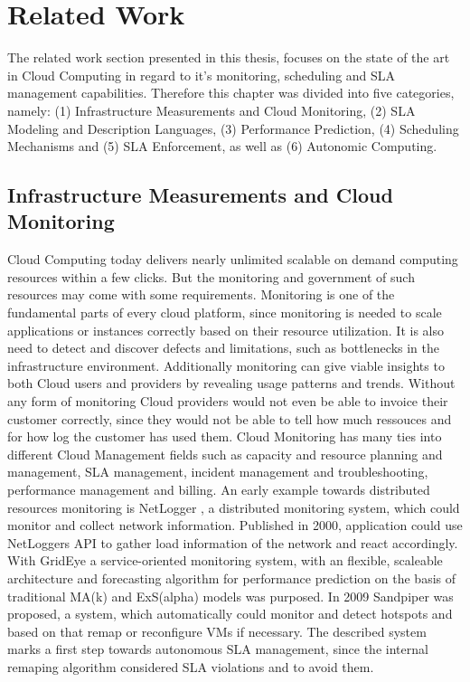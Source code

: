 
\chapter{Related Work} %
\label{Related Work} %
The related work section presented in this thesis, focuses on the state of the art in Cloud Computing in regard to it's monitoring, scheduling and SLA management capabilities. Therefore this chapter was divided into five categories, namely: (1) Infrastructure Measurements and Cloud Monitoring, (2) SLA Modeling and Description Languages, (3) Performance Prediction, (4) Scheduling Mechanisms and (5) SLA Enforcement, as well as (6) Autonomic Computing.

\section{Infrastructure Measurements and Cloud Monitoring}
Cloud Computing today delivers nearly unlimited scalable on demand computing resources within a few clicks. But the monitoring and government of such resources may come with some requirements. Monitoring is one of the fundamental parts of every cloud platform, since monitoring is needed to scale applications or instances correctly based on their resource utilization. It is also need to detect and discover defects and limitations, such as bottlenecks in the infrastructure environment. Additionally monitoring can give viable insights to both Cloud users and providers by revealing usage patterns and trends. Without any form of monitoring Cloud providers would not even be able to invoice their customer correctly, since they would not be able to tell how much ressouces and for how log the customer has used them. Cloud Monitoring has many ties into different Cloud Management fields such as capacity and resource planning and management, SLA management, incident management and troubleshooting, performance management and billing. An early example towards distributed resources monitoring is NetLogger  \cite{DBLP:conf/mascots/2000}, a distributed monitoring system, which could monitor and collect network information. Published in 2000, application could use NetLoggers API to gather load information of the network and react accordingly. With GridEye  \cite{Fu:2006:GSG:1170138.1170724} a service-oriented monitoring system, with an flexible, scaleable architecture and forecasting algorithm for performance prediction on the basis of traditional MA(k) and ExS(alpha) models was purposed. In 2009 Sandpiper  \cite{Wood:2009:SBG:1663647.1663710} was proposed, a system, which automatically could monitor and detect hotspots and based on that remap or reconfigure VMs if necessary. The described system marks a first step towards autonomous SLA management, since the internal remaping algorithm considered SLA violations and to avoid them. 
